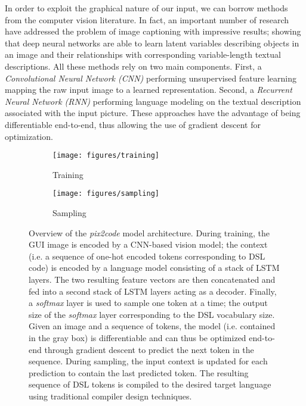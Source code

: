 \documentclass{article}
\begin{document}
In order to exploit the graphical nature of our input, we can borrow methods from the computer vision literature. In fact, an important number of research \cite{vinyals2015show, donahue2015long, karpathy2015deep, xu2015show} have addressed the problem of image captioning with impressive results; showing that deep neural networks are able to learn latent variables describing objects in an image and their relationships with corresponding variable-length textual descriptions. All these methods rely on two main components. First, a \emph{Convolutional Neural Network (CNN)} performing unsupervised feature learning mapping the raw input image to a learned representation. Second, a \emph{Recurrent Neural Network (RNN)} performing language modeling on the textual description associated with the input picture. These approaches have the advantage of being differentiable end-to-end, thus allowing the use of gradient descent for optimization.

\begin{figure}[H]
    \begin{subfigure}{.5\textwidth}
        \centering
        \texttt{[image: figures/training]}
        \caption{Training}
    \end{subfigure}
    \begin{subfigure}{.5\textwidth}
        \centering
        \texttt{[image: figures/sampling]}
        \caption{Sampling}
    \end{subfigure}
    \caption{Overview of the \emph{pix2code} model architecture. During training, the GUI image is encoded by a CNN-based vision model; the context (i.e. a sequence of one-hot encoded tokens corresponding to DSL code) is encoded by a language model consisting of a stack of LSTM layers. The two resulting feature vectors are then concatenated and fed into a second stack of LSTM layers acting as a decoder. Finally, a \emph{softmax} layer is used to sample one token at a time; the output size of the \emph{softmax} layer corresponding to the DSL vocabulary size. Given an image and a sequence of tokens, the model (i.e. contained in the gray box) is differentiable and can thus be optimized end-to-end through gradient descent to predict the next token in the sequence. During sampling, the input context is updated for each prediction to contain the last predicted token. The resulting sequence of DSL tokens is compiled to the desired target language using traditional compiler design techniques.}
    \label{fig:training_sampling}
\end{figure}
\end{document}
